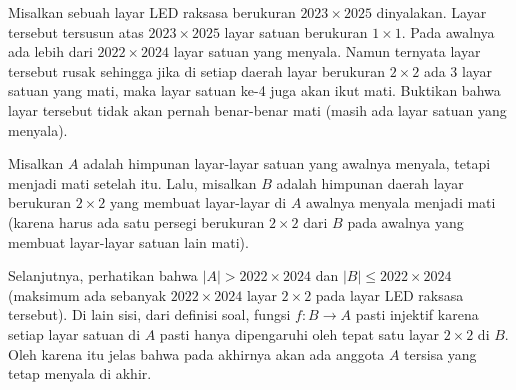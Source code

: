 \documentclass[11pt]{scrartcl}
\begin{document}
\begin{soaljawab}
    Misalkan sebuah layar LED raksasa berukuran $2023 \times 2025$ dinyalakan. Layar tersebut tersusun atas $2023 \times 2025$ layar satuan berukuran $1 \times 1$. Pada awalnya ada lebih dari $2022 \times 2024$ layar satuan yang menyala. Namun ternyata layar tersebut rusak sehingga jika di setiap daerah layar berukuran $2 \times 2$ ada 3 layar satuan yang mati, maka layar satuan ke-4 juga akan ikut mati. Buktikan bahwa layar tersebut tidak akan pernah benar-benar mati (masih ada layar satuan yang menyala).
    \begin{solusi}
        Misalkan $A$ adalah himpunan layar-layar satuan yang awalnya menyala, tetapi menjadi mati setelah itu. Lalu, misalkan $B$ adalah himpunan daerah layar berukuran $2 \times 2$ yang membuat layar-layar di $A$ awalnya menyala menjadi mati (karena harus ada satu persegi berukuran $2 \times 2$ dari $B$ pada awalnya yang membuat layar-layar satuan lain mati).

        Selanjutnya, perhatikan bahwa $|A| > 2022 \times 2024$ dan $|B| \le 2022 \times 2024$ (maksimum ada sebanyak $2022 \times 2024$ layar $2 \times 2$ pada layar LED raksasa tersebut). Di lain sisi, dari definisi soal, fungsi $f : B \to A$ pasti injektif karena setiap layar satuan di $A$ pasti hanya dipengaruhi oleh tepat satu layar $2 \times 2$ di $B$. Oleh karena itu jelas bahwa pada akhirnya akan ada anggota $A$ tersisa yang tetap menyala di akhir.
    \end{solusi}
\end{soaljawab}
\end{document}
